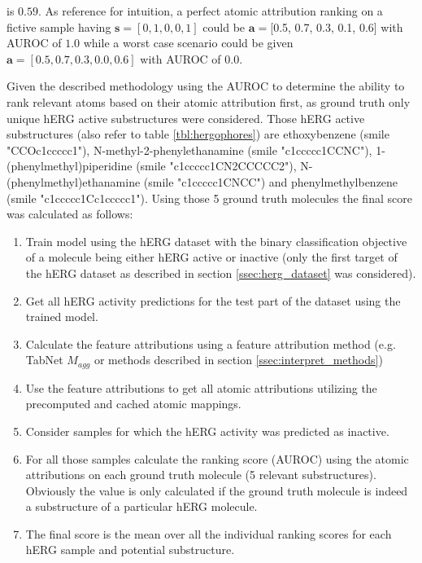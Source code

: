 \documentclass[../main.tex]{subfiles}
\begin{document}
is $0.59$. 
As reference for intuition, a perfect atomic attribution ranking on a fictive sample having $\mathbf{s} = [0, 1, 0, 0, 1]$ could be $\mathbf{a} = $[0.5, 0.7, 0.3, 0.1, 0.6] with AUROC of $1.0$ while a worst case scenario could be given $\mathbf{a} = [0.5, 0.7, 0.3, 0.0, 0.6]$ with AUROC of $0.0$.
\newline


Given the described methodology using the AUROC to determine the ability to rank relevant atoms based on their atomic attribution first, as ground truth only unique hERG active substructures were considered. Those hERG active substructures (also refer to table \ref{tbl:hergophores}) are ethoxybenzene (smile "CCOc1ccccc1"), N-methyl-2-phenylethanamine (smile "c1ccccc1CCNC"), 1-(phenylmethyl)piperidine (smile "c1ccccc1CN2CCCCC2"), N-(phenylmethyl)ethanamine (smile "c1ccccc1CNCC") and phenylmethylbenzene (smile "c1ccccc1Cc1ccccc1"). Using those 5 ground truth molecules the final score was calculated as follows:

\begin{enumerate}
	\item Train model using the hERG dataset with the binary classification objective of a molecule being either hERG active or inactive (only the first target of the hERG dataset as described in section \ref{ssec:herg_dataset} was considered).
	\item Get all hERG activity predictions for the test part of the dataset using the trained model.
	\item Calculate the feature attributions using a feature attribution method (e.g. TabNet $M_{agg}$ or methods described in section \ref{ssec:interpret_methods})
	\item Use the feature attributions to get all atomic attributions utilizing the precomputed and cached atomic mappings.
	\item Consider samples for which the hERG activity was predicted as inactive. 
	\item For all those samples calculate the ranking score (AUROC) using the atomic attributions on each ground truth molecule (5 relevant substructures). Obviously the value is only calculated if the ground truth molecule is indeed a substructure of a particular hERG molecule.
	\item The final score is the mean over all the individual ranking scores for each hERG sample and potential substructure. 
\end{enumerate}
\end{document}
